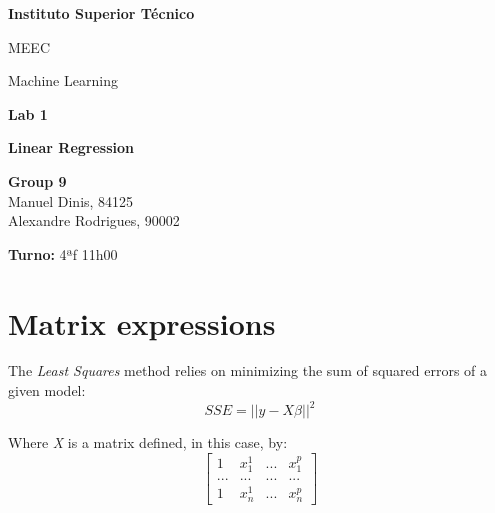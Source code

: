 \documentclass[a4paper,2pt]{report}
\begin{document}
\begin{titlepage}
    \begin{center}
        \vspace*{3cm}
 
        \LARGE
        \textbf{Instituto Superior Técnico}
        \vskip 0.4cm
 
        \Large{MEEC}
        \vskip 0.2cm

        \Large{Machine Learning}
        \vskip 3cm
        

 
        \Huge{\textbf{Lab 1}}
        \vskip 0.5cm

        \huge{\textbf{Linear Regression}}
        \vskip 0.5cm

 
        \vfill
 
        \large
        \textbf{Group 9}\\
        \vspace{0.3cm}
        Manuel Dinis, 84125\\
        Alexandre Rodrigues, 90002\\
        
        \vspace{1cm}

        \textbf{Turno:} 4ªf 11h00

    \end{center}
\end{titlepage}

\tableofcontents
\newpage

\setcounter{chapter}{1}
\section{Matrix expressions}

    \par The \textit{Least Squares} method relies on minimizing the sum of squared errors of a given model:
    \begin{equation}
        \textit{SSE} = ||y - X\beta||^2
    \end{equation}

    \par Where \textit{X} is a matrix defined, in this case, by:
    \begin{equation}
        \begin{bmatrix}
            1 & x_1^1 & \textit{...} & x_1^p\\
            \textit{...} & \textit{...} & \textit{...} & \textit{...}\\
            1 & x_n^1 & \textit{...} & x_n^p
        \end{bmatrix}
    \end{equation}
\end{document}
